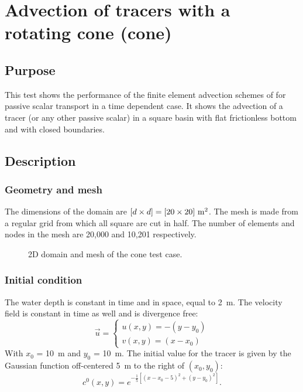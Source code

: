 \chapter{Advection of tracers with a rotating cone (cone)}

\section{Purpose}
This test shows the performance of the finite element advection schemes of
 for passive scalar transport in a time dependent case.
It shows the advection of a tracer (or any other passive scalar) in a square
basin with flat frictionless bottom and with closed boundaries.

\section{Description}

\subsection{Geometry and mesh}

The dimensions of the domain are $[d \times d]=[20 \times 20]~\rm{m}^2$.
The mesh is made from a regular grid from which all square are cut in half.
The number of elements and nodes in the mesh are 20,000 and 10,201 respectively.

\begin{figure}[h!]
\centering
{}
\caption{2D domain and mesh of the cone test case.}
\label{t2d:cone:mesh}
\end{figure}

\subsection{Initial condition}

The water depth is constant in time and in space, equal to 2~m.
The velocity field is constant in time as well and is divergence free:
\begin{equation*}
  \vec{u}=\left\{
         \begin{array}{l}
          u(x,y)=-(y-y_0) \\
          v(x,y)=(x-x_0)
         \end{array}\right.
\end{equation*}
With $x_0$ = 10~m and $y_0$ = 10~m. The initial value for the tracer is given by
the Gaussian function off-centered 5~m to the right of $(x_0, y_0)$:
\begin{equation*}
c^0(x,y)=e^{-\frac{1}{5}[(x-x_0-5)^2+(y-y_0)^2]}.
\end{equation*}

